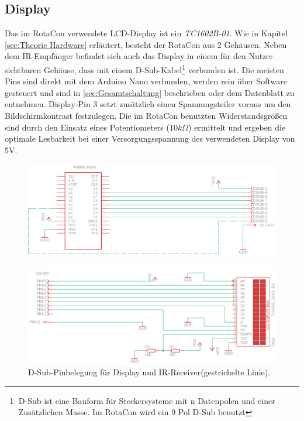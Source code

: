 \documentclass[11pt, titlepage, fleqn]{report}
\begin{document}
			\subsection{Display}
			\label{sec:Display}
				Das im RotaCon verwendete LCD-Display ist ein \textit{TC1602B-01}. Wie in Kapitel \ref{sec:Theorie Hardware} erläutert, besteht der RotaCon aus 2 Gehäusen. Neben dem IR-Empfänger befindet sich auch das Display in einem für den Nutzer sichtbaren Gehäuse, dass mit einem D-Sub-Kabel\footnote{D-Sub ist eine Bauform für Steckersysteme mit n Datenpolen und einer Zusätzlichen Masse. Im RotaCon wird ein 9 Pol D-Sub benutzt} verbunden ist. Die meisten Pins sind direkt mit dem Arduino Nano verbunden, werden rein über Software gesteuert und sind in \ref{sec:Gesamtschaltung} beschrieben oder dem Datenblatt zu entnehmen. Display-Pin 3 setzt zusätzlich einen Spannungsteiler voraus um den Bildschirmkontrast festzulegen. Die im RotaCon benutzten Widerstandsgrößen sind durch den Einsatz eines Potentiometers ($10k\Omega$) ermittelt und ergeben die optimale Lesbarkeit bei einer Versorgungsspannung des verwendeten Display von 5V.
				\begin{figure}[htbp]
					\includegraphics[width=\linewidth]{./img/dsub2.png}
					\label{fig:imgDisplay}
				\end{figure}
				\begin{figure}[htbp]
					\includegraphics[width=\linewidth]{./img/display2.png}
					\caption{D-Sub-Pinbelegung für Display und IR-Receiver(gestrichelte Linie).
					\label{fig:imgDSUB}}
				\end{figure}
\end{document}
